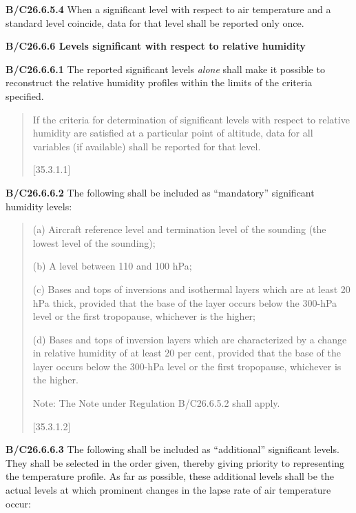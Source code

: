 \textbf{B/C26.6.5.4} When a significant level with respect to air temperature and a standard level coincide, data for that level shall be reported only once.

\textbf{B/C26.6.6 Levels significant with respect to relative humidity}

\textbf{B/C26.6.6.1} The reported significant levels \emph{alone} shall make it possible to reconstruct the relative humidity profiles within the limits of the criteria specified.

\begin{quote}
If the criteria for determination of significant levels with respect to relative humidity are satisfied at a particular point of altitude, data for all variables (if available) shall be reported for that level.

{[}35.3.1.1{]}
\end{quote}

\textbf{B/C26.6.6.2} The following shall be included as ``mandatory'' significant humidity levels:

\begin{quote}
(a) Aircraft reference level and termination level of the sounding (the lowest level of the sounding);

(b) A level between 110 and 100 hPa;

(c) Bases and tops of inversions and isothermal layers which are at least 20 hPa thick, provided that the base of the layer occurs below the 300-hPa level or the first tropopause, whichever is the higher;

(d) Bases and tops of inversion layers which are characterized by a change in relative humidity of at least 20 per cent, provided that the base of the layer occurs below the 300-hPa level or the first tropopause, whichever is the higher.

Note: The Note under Regulation B/C26.6.5.2 shall apply.

{[}35.3.1.2{]}
\end{quote}

\textbf{B/C26.6.6.3} The following shall be included as ``additional'' significant levels. They shall be selected in the order given, thereby giving priority to representing the temperature profile. As far as possible, these additional levels shall be the actual levels at which prominent changes in the lapse rate of air temperature occur:

